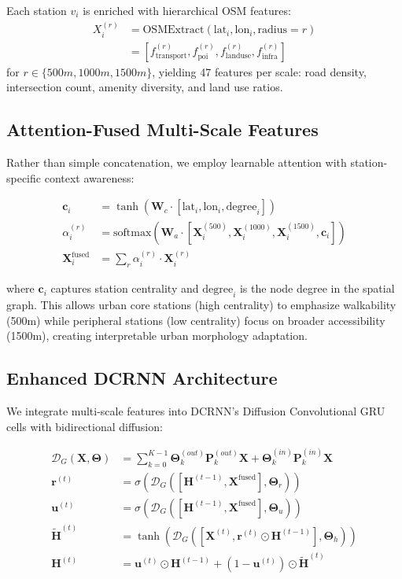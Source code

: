\documentclass{article}
\begin{document}
Each station $v_i$ is enriched with hierarchical OSM features:
\begin{align}
X_i^{(r)} &= \text{OSMExtract}(\text{lat}_i, \text{lon}_i, \text{radius}=r) \\
&= [f_{\text{transport}}^{(r)}, f_{\text{poi}}^{(r)}, f_{\text{landuse}}^{(r)}, f_{\text{infra}}^{(r)}]
\end{align}
for $r \in \{500m, 1000m, 1500m\}$, yielding 47 features per scale: road density, intersection count, amenity diversity, and land use ratios.

\subsection{Attention-Fused Multi-Scale Features}
Rather than simple concatenation, we employ learnable attention with station-specific context awareness:

\begin{align}
\mathbf{c}_i &= \tanh(\mathbf{W}_c \cdot [\text{lat}_i, \text{lon}_i, \text{degree}_i]) \\
\alpha_i^{(r)} &= \text{softmax}(\mathbf{W}_a \cdot [\mathbf{X}_i^{(500)}, \mathbf{X}_i^{(1000)}, \mathbf{X}_i^{(1500)}, \mathbf{c}_i]) \\
\mathbf{X}_i^{\text{fused}} &= \sum_{r} \alpha_i^{(r)} \cdot \mathbf{X}_i^{(r)}
\end{align}

where $\mathbf{c}_i$ captures station centrality and $\text{degree}_i$ is the node degree in the spatial graph. This allows urban core stations (high centrality) to emphasize walkability (500m) while peripheral stations (low centrality) focus on broader accessibility (1500m), creating interpretable urban morphology adaptation.

\subsection{Enhanced DCRNN Architecture}
We integrate multi-scale features into DCRNN's Diffusion Convolutional GRU cells with bidirectional diffusion:

\begin{align}
\mathcal{D}_G(\mathbf{X}, \boldsymbol{\Theta}) &= \sum_{k=0}^{K-1} \boldsymbol{\Theta}_k^{(out)} \mathbf{P}_k^{(out)} \mathbf{X} + \boldsymbol{\Theta}_k^{(in)} \mathbf{P}_k^{(in)} \mathbf{X} \\
\mathbf{r}^{(t)} &= \sigma(\mathcal{D}_G([\mathbf{H}^{(t-1)}, \mathbf{X}^{\text{fused}}], \boldsymbol{\Theta}_r)) \\
\mathbf{u}^{(t)} &= \sigma(\mathcal{D}_G([\mathbf{H}^{(t-1)}, \mathbf{X}^{\text{fused}}], \boldsymbol{\Theta}_u)) \\
\tilde{\mathbf{H}}^{(t)} &= \tanh(\mathcal{D}_G([\mathbf{X}^{(t)}, \mathbf{r}^{(t)} \odot \mathbf{H}^{(t-1)}], \boldsymbol{\Theta}_h)) \\
\mathbf{H}^{(t)} &= \mathbf{u}^{(t)} \odot \mathbf{H}^{(t-1)} + (1-\mathbf{u}^{(t)}) \odot \tilde{\mathbf{H}}^{(t)}
\end{align}
\end{document}
